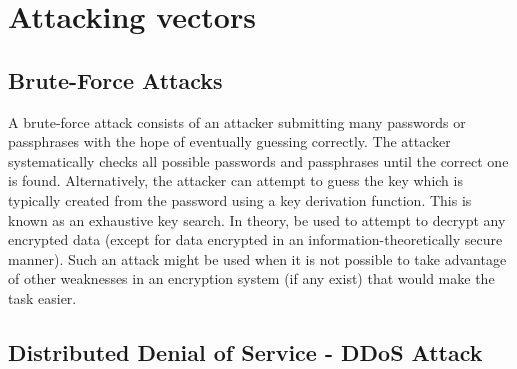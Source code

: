 \documentclass[twocolumn]{article}
\begin{document}
\section{Attacking vectors}

\subsection{Brute-Force Attacks}

A brute-force attack consists of an attacker submitting many passwords or passphrases with the hope of eventually guessing correctly.
The attacker systematically checks all possible passwords and passphrases until the correct one is found. Alternatively, the attacker can attempt to guess the key which is typically created from the password using a key derivation function.
This is known as an exhaustive key search.
In theory, be used to attempt to decrypt any encrypted data (except for data encrypted in an information-theoretically secure manner). Such an attack might be used when it is not possible to take advantage of other weaknesses in an encryption system (if any exist) that would make the task easier\cite{kanakam2022bruteforce}.

\subsection{Distributed Denial of Service - DDoS Attack}
\end{document}
